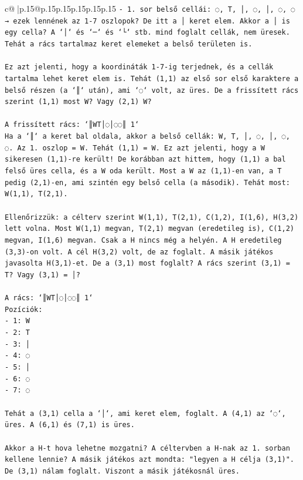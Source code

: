 \documentclass{article}
\begin{document}
{\begin{supertabular}{c@{$\;$}|p{.15\linewidth}@{}p{.15\linewidth}p{.15\linewidth}p{.15\linewidth}p{.15\linewidth}p{.15\linewidth}}
{{{\texttt{{-} 1. sor belső cellái: ◌, T, │, ◌, │, ◌, ◌ → ezek lennének az 1{-}7 oszlopok? De itt a │ keret elem. Akkor a │ is egy cella? A `│` és `─` és `└` stb. mind foglalt cellák, nem üresek. Tehát a rács tartalmaz keret elemeket a belső területen is.} \\
\\ 
\texttt{Ez azt jelenti, hogy a koordináták 1{-}7{-}ig terjednek, és a cellák tartalma lehet keret elem is. Tehát (1,1) az első sor első karaktere a belső részen (a `║` után), ami `◌` volt, az üres. De a frissített rács szerint (1,1) most W? Vagy (2,1) W?} \\
\\ 
\texttt{A frissített rács: `║WT│◌│◌◌║ 1`} \\
\texttt{Ha a `║` a keret bal oldala, akkor a belső cellák: W, T, │, ◌, │, ◌, ◌. Az 1. oszlop = W. Tehát (1,1) = W. Ez azt jelenti, hogy a W sikeresen (1,1){-}re került! De korábban azt hittem, hogy (1,1) a bal felső üres cella, és a W oda került. Most a W az (1,1){-}en van, a T pedig (2,1){-}en, ami szintén egy belső cella (a második). Tehát most: W(1,1), T(2,1). } \\
\\ 
\texttt{Ellenőrizzük: a célterv szerint W(1,1), T(2,1), C(1,2), I(1,6), H(3,2) lett volna. Most W(1,1) megvan, T(2,1) megvan (eredetileg is), C(1,2) megvan, I(1,6) megvan. Csak a H nincs még a helyén. A H eredetileg (3,3){-}on volt. A cél H(3,2) volt, de az foglalt. A másik játékos javasolta H(3,1){-}et. De a (3,1) most foglalt? A rács szerint (3,1) = T? Vagy (3,1) = │?} \\
\\ 
\texttt{A rács: `║WT│◌│◌◌║ 1`} \\
\texttt{Pozíciók:} \\
\texttt{{-} 1: W} \\
\texttt{{-} 2: T} \\
\texttt{{-} 3: │} \\
\texttt{{-} 4: ◌} \\
\texttt{{-} 5: │} \\
\texttt{{-} 6: ◌} \\
\texttt{{-} 7: ◌} \\
\\ 
\texttt{Tehát a (3,1) cella a `│`, ami keret elem, foglalt. A (4,1) az `◌`, üres. A (6,1) és (7,1) is üres.} \\
\\ 
\texttt{Akkor a H{-}t hova lehetne mozgatni? A céltervben a H{-}nak az 1. sorban kellene lennie? A másik játékos azt mondta: "legyen a H célja (3,1)". De (3,1) nálam foglalt. Viszont a másik játékosnál üres. } \\
}}}
\end{supertabular}}
\end{document}
